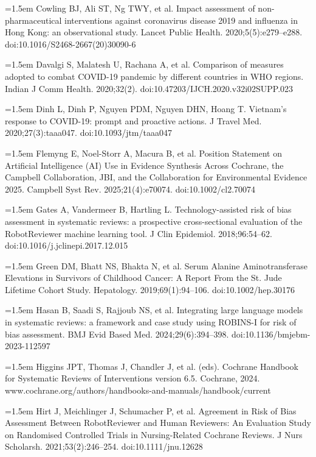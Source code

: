 \documentclass[11pt,a4paper]{article}
\newcommand{\referenceitem}[1]{\noindent\hangafter=1\hangindent=1.5em #1\par\medskip}
\begin{document}
\referenceitem{Cowling BJ, Ali ST, Ng TWY, et al. Impact assessment of non-pharmaceutical interventions against coronavirus disease 2019 and influenza in Hong Kong: an observational study. Lancet Public Health. 2020;5(5):e279–e288. doi:10.1016/S2468-2667(20)30090-6}

\referenceitem{Davalgi S, Malatesh U, Rachana A, et al. Comparison of measures adopted to combat COVID-19 pandemic by different countries in WHO regions. Indian J Comm Health. 2020;32(2). doi:10.47203/IJCH.2020.v32i02SUPP.023}

\referenceitem{Dinh L, Dinh P, Nguyen PDM, Nguyen DHN, Hoang T. Vietnam's response to COVID-19: prompt and proactive actions. J Travel Med. 2020;27(3):taaa047. doi:10.1093/jtm/taaa047}

\referenceitem{Flemyng E, Noel-Storr A, Macura B, et al. Position Statement on Artificial Intelligence (AI) Use in Evidence Synthesis Across Cochrane, the Campbell Collaboration, JBI, and the Collaboration for Environmental Evidence 2025. Campbell Syst Rev. 2025;21(4):e70074. doi:10.1002/cl2.70074}

\referenceitem{Gates A, Vandermeer B, Hartling L. Technology-assisted risk of bias assessment in systematic reviews: a prospective cross-sectional evaluation of the RobotReviewer machine learning tool. J Clin Epidemiol. 2018;96:54–62. doi:10.1016/j.jclinepi.2017.12.015}

\referenceitem{Green DM, Bhatt NS, Bhakta N, et al. Serum Alanine Aminotransferase Elevations in Survivors of Childhood Cancer: A Report From the St. Jude Lifetime Cohort Study. Hepatology. 2019;69(1):94–106. doi:10.1002/hep.30176}

\referenceitem{Hasan B, Saadi S, Rajjoub NS, et al. Integrating large language models in systematic reviews: a framework and case study using ROBINS-I for risk of bias assessment. BMJ Evid Based Med. 2024;29(6):394–398. doi:10.1136/bmjebm-2023-112597}

\referenceitem{Higgins JPT, Thomas J, Chandler J, et al. (eds). Cochrane Handbook for Systematic Reviews of Interventions version 6.5. Cochrane, 2024. www.cochrane.org/authors/handbooks-and-manuals/handbook/current}

\referenceitem{Hirt J, Meichlinger J, Schumacher P, et al. Agreement in Risk of Bias Assessment Between RobotReviewer and Human Reviewers: An Evaluation Study on Randomised Controlled Trials in Nursing-Related Cochrane Reviews. J Nurs Scholarsh. 2021;53(2):246–254. doi:10.1111/jnu.12628}
\end{document}
